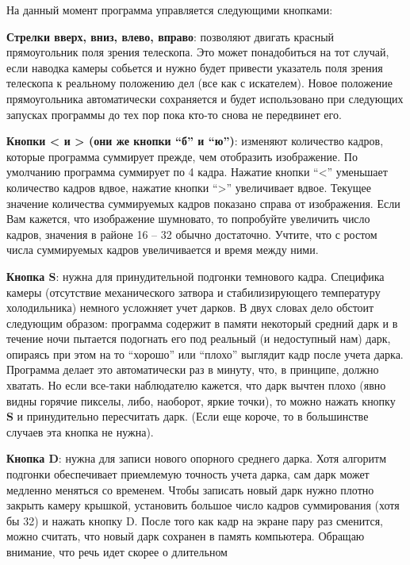 \message{ !name(skycam_manual.tex)}\documentclass[a4paper,12pt,leqno,notitlepage]{article}
\begin{document}
На данный момент программа управляется следующими кнопками:

\textbf{Стрелки вверх, вниз, влево, вправо}: позволяют двигать красный прямоугольник поля
зрения телескопа. Это может понадобиться на тот случай, если наводка камеры собьется и нужно
будет привести указатель поля зрения телескопа к реальному положению дел (все как с искателем).
Новое положение прямоугольника автоматически сохраняется и будет использовано при следующих
запусках программы до тех пор пока кто-то снова не передвинет его.

\textbf{Кнопки < и > (они же кнопки ``б'' и ``ю'')}: изменяют количество кадров, которые
программа суммирует прежде, чем отобразить изображение. По умолчанию программа суммирует
по 4 кадра. Нажатие кнопки ``<'' уменьшает количество кадров вдвое, нажатие кнопки ``>''
увеличивает вдвое. Текущее значение количества суммируемых кадров показано справа от изображения.
Если Вам кажется, что изображение шумновато, то попробуйте увеличить число кадров, значения
в районе 16 -- 32 обычно достаточно. Учтите, что с ростом числа суммируемых кадров увеличивается и время
между ними.

\textbf{Кнопка S}: нужна для принудительной подгонки темнового кадра. Специфика камеры
(отсутствие механического затвора и стабилизирующего температуру холодильника) немного усложняет
учет дарков. В двух словах дело обстоит следующим образом: программа содержит в памяти некоторый
средний дарк и в течение ночи пытается подогнать его под реальный (и недоступный нам) дарк, опираясь при этом
на то ``хорошо'' или ``плохо'' выглядит кадр после учета дарка. Программа делает это автоматически
раз в минуту, что, в принципе, должно хватать. Но если все-таки наблюдателю кажется, что дарк вычтен
плохо (явно видны горячие пикселы, либо, наоборот, яркие точки), то можно нажать кнопку \textbf{S}
и принудительно пересчитать дарк. (Если еще короче, то в большинстве случаев эта кнопка не нужна).

\textbf{Кнопка D}: нужна для записи нового опорного среднего дарка. Хотя алгоритм подгонки
обеспечивает приемлемую точность учета дарка, сам дарк может медленно меняться со временем.
Чтобы записать новый дарк нужно плотно закрыть камеру крышкой, установить большое число кадров
суммирования (хотя бы 32) и нажать кнопку D. После того как кадр на экране пару раз сменится,
можно считать, что новый дарк сохранен в память компьютера. Обращаю внимание, что речь идет
скорее о длительном 
\end{document}

